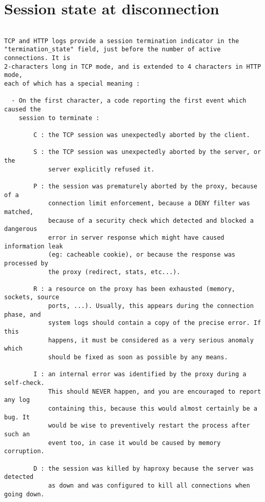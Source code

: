 
\section{Session state at disconnection}

\begin{verbatim}

TCP and HTTP logs provide a session termination indicator in the
"termination_state" field, just before the number of active connections. It is
2-characters long in TCP mode, and is extended to 4 characters in HTTP mode,
each of which has a special meaning :

  - On the first character, a code reporting the first event which caused the
    session to terminate :

        C : the TCP session was unexpectedly aborted by the client.

        S : the TCP session was unexpectedly aborted by the server, or the
            server explicitly refused it.

        P : the session was prematurely aborted by the proxy, because of a
            connection limit enforcement, because a DENY filter was matched,
            because of a security check which detected and blocked a dangerous
            error in server response which might have caused information leak
            (eg: cacheable cookie), or because the response was processed by
            the proxy (redirect, stats, etc...).

        R : a resource on the proxy has been exhausted (memory, sockets, source
            ports, ...). Usually, this appears during the connection phase, and
            system logs should contain a copy of the precise error. If this
            happens, it must be considered as a very serious anomaly which
            should be fixed as soon as possible by any means.

        I : an internal error was identified by the proxy during a self-check.
            This should NEVER happen, and you are encouraged to report any log
            containing this, because this would almost certainly be a bug. It
            would be wise to preventively restart the process after such an
            event too, in case it would be caused by memory corruption.

        D : the session was killed by haproxy because the server was detected
            as down and was configured to kill all connections when going down.


\end{verbatim}
